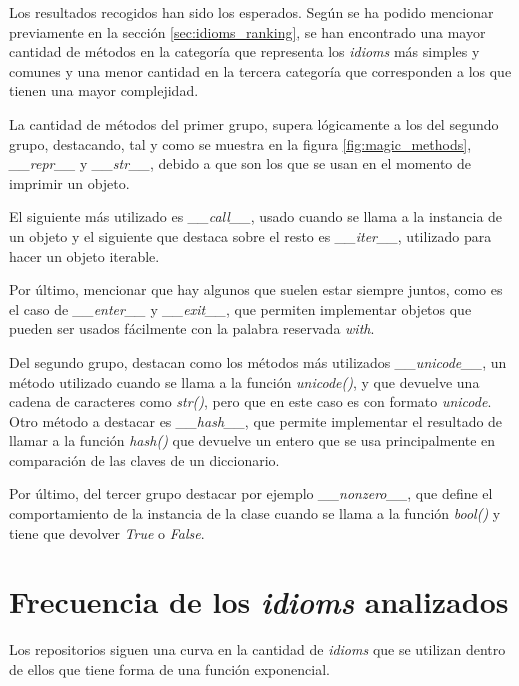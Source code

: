 \documentclass[a4paper, 12pt]{book}
\begin{document}
Los resultados recogidos han sido los esperados. Según se ha podido mencionar previamente en la sección \ref{sec:idioms_ranking}, se han encontrado una mayor cantidad de métodos en la categoría que representa los \textit{idioms} más simples y comunes y una menor cantidad en la tercera categoría que corresponden a los que tienen una mayor complejidad.

La cantidad de métodos del primer grupo, supera lógicamente a los del segundo grupo, destacando, tal y como se muestra en la figura \ref{fig:magic_methods}, \textit{\_\_repr\_\_} y \textit{\_\_str\_\_}, debido a que son los que se usan en el momento de imprimir un objeto.

El siguiente más utilizado es \textit{\_\_call\_\_}, usado cuando se llama a la instancia de un objeto y el siguiente que destaca sobre el resto es \textit{\_\_iter\_\_}, utilizado para hacer un objeto iterable.

Por último, mencionar que hay algunos que suelen estar siempre juntos, como es el caso de \textit{\_\_enter\_\_} y \textit{\_\_exit\_\_}, que permiten implementar objetos que pueden ser usados fácilmente con la palabra reservada \textit{with}.

Del segundo grupo, destacan como los métodos más utilizados \textit{\_\_unicode\_\_}, un método utilizado cuando se llama a la función \textit{unicode()}, y que devuelve una cadena de caracteres como \textit{str()}, pero que en este caso es con formato \textit{unicode}. Otro método a destacar es \textit{\_\_hash\_\_}, que permite implementar el resultado de llamar a la función \textit{hash()} que devuelve un entero que se usa principalmente en comparación de las claves de un diccionario.

Por último, del tercer grupo destacar por ejemplo \textit{\_\_nonzero\_\_}, que define el comportamiento de la instancia de la clase cuando se llama a la función \textit{bool()} y tiene que devolver \textit{True} o \textit{False}.




\section{Frecuencia de los \textit{idioms} analizados}
Los repositorios siguen una curva en la cantidad de \textit{idioms} que se utilizan dentro de ellos que tiene forma de una función exponencial.
\end{document}
